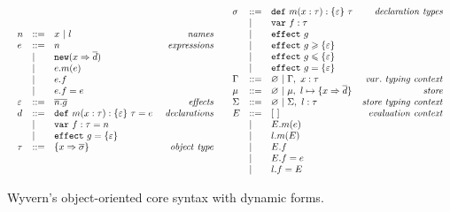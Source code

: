 \begin{figure}[th]
{\footnotesize
\[
\begin{array}{lll}
\begin{array}{lllr}
n & ::= & x~|~l & \mathit{names}\\
e & ::= & n & \mathit{expressions}\\
& | & \mathtt{new}(x \Rightarrow \overline{d}) \\
& | & e.m(e)\\
& | & e.f \\
& | & e.f = e \\
\varepsilon & ::= & \overline{n.g} & \mathit{effects}\\
d & ::= & \mathtt{def}~ m(x : \tau) : \{ \varepsilon \}~\tau = e &~\mathit{declarations}\\
& |   & \mathtt{var}~ f : \tau = n\\
& |   & \mathtt{effect}~ g = \{ \varepsilon \} \\
\tau & ::= & \{ x \Rightarrow \overline{\sigma} \} & \mathit{object~type}\\
\end{array}
~~~
\begin{array}{lllr}
\sigma & ::= & \mathtt{def}~ m(x : \tau) : \{ \varepsilon \}~\tau & \mathit{declaration~types}\\
       & |   & \mathtt{var}~ f: \tau\\
       & |   & \mathtt{effect}~ g \\
       & |   & \mathtt{effect}~ g \geqslant \{ \varepsilon \}\\
       & |   & \mathtt{effect}~ g \leqslant \{ \varepsilon \}\\
       & |   & \mathtt{effect}~ g = \{ \varepsilon \} \\
\Gamma & :: = & \varnothing~|~\Gamma,~x : \tau & \mathit{var.~typing~context}\\
\mu & :: = & \varnothing~|~\mu,~l \mapsto \{ x \Rightarrow \overline{d} \} & \mathit{store}\\
\Sigma & :: = & \varnothing~|~\Sigma,~l : \tau & \mathit{store~typing~context}\\
E & ::= & [~] & \mathit{evaluation~context}\\
  & |   & E.m(e)\\
  & |   & l.m(E)\\
  & |   & E.f \\
  & |   & E.f = e \\
  & |   & l.f = E
\end{array}
\end{array}
\]
}
\caption{Wyvern's object-oriented core syntax with dynamic forms.}
\label{f-effects-syntax-with-dynamic-semantics}
\end{figure}

